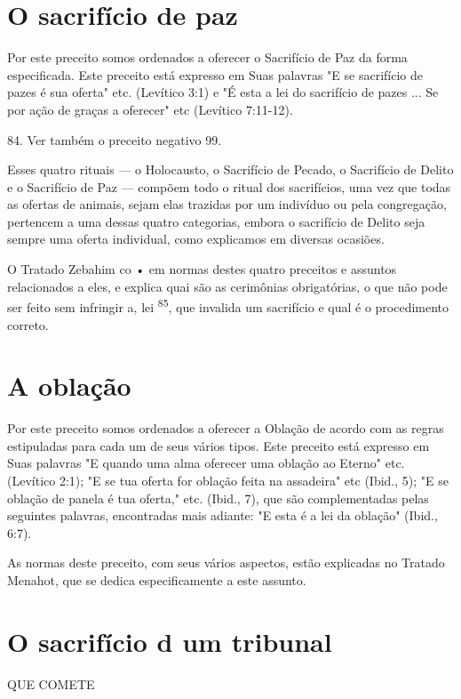 \begin{itemize}
\begin{enumrate}
\begin{itemize}
\begin{itemize}
\section{O sacrifício de paz}

Por este preceito somos ordenados a oferecer o Sacrifício de Paz da
forma especificada. Este preceito está expresso em Suas palavras "E se
sacrifí­cio de pazes é sua oferta" etc. (Levítico 3:1) e "É esta a lei
do sacrifício de pazes ... Se por ação de graças a oferecer" etc
(Levítico 7:11-12).

84. Ver também o preceito negativo 99.

Esses quatro rituais --- o Holocausto, o Sacrifício de Pecado, o
Sacri­fício de Delito e o Sacrifício de Paz --- compõem todo o ritual
dos sacrifícios, uma vez que todas as ofertas de animais, sejam elas
trazidas por um indivíduo ou pela congregação, pertencem a uma dessas
quatro categorias, embora o sa­crifício de Delito seja sempre uma oferta
individual, como explicamos em di­versas ocasiões.

O Tratado Zebahim co • em normas destes quatro preceitos e as­suntos
relacionados a eles, e explica quai são as cerimônias obrigatórias, o
que não pode ser feito sem infringir a, lei \textsuperscript{85}, que
invalida um sacrifício e qual é o procedimento correto.

\section{A oblação}

Por este preceito somos ordenados a oferecer a Oblação de acordo com as
regras estipuladas para cada um de seus vários tipos. Este preceito está
expresso em Suas palavras "E quando uma alma oferecer uma oblação ao
Eter­no" etc. (Levítico 2:1); "E se tua oferta for oblação feita na
assadeira" etc (Ibid., 5); "E se oblação de panela é tua oferta," etc.
(Ibid., 7), que são complementa­das pelas seguintes palavras,
encontradas mais adiante: "E esta é a lei da obla­ção" (Ibid., 6:7).

As normas deste preceito, com seus vários aspectos, estão explica­das no
Tratado Menahot, que se dedica especificamente a este assunto.

\section{O sacrifício d um tribunal}


QUE COMETE



\end{itemize}
\end{itemize}
\end{enumrate}
\end{itemize}
